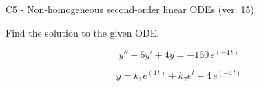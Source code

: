 \begin{exercise}
  \begin{exerciseTitle}C5 - Non-homogeneous second-order linear ODEs (ver. 15)\end{exerciseTitle}
  \begin{exerciseStatement}
    
Find the solution to the given ODE.

    
\[y''-5y'+4y = -160 \, e^{\left(-4 \, t\right)}\]

  \end{exerciseStatement}
  \begin{exerciseAnswer}
    
\[y= k_{1} e^{\left(4 \, t\right)} + k_{2} e^{t} - 4 \, e^{\left(-4 \, t\right)}\]

  \end{exerciseAnswer}
\end{exercise}